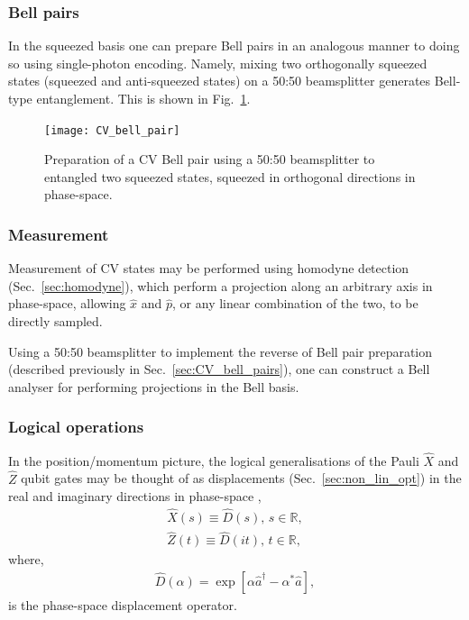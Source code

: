 %
%

\subsubsection{Bell pairs}\label{sec:CV_bell_pairs}

In the squeezed basis one can prepare Bell pairs in an analogous manner to doing so using single-photon encoding. Namely, mixing two orthogonally squeezed states (squeezed and anti-squeezed states) on a 50:50 beamsplitter generates Bell-type entanglement. This is shown in Fig.~\ref{fig:CV_bell_pair}.

\begin{figure}[!htbp]
\texttt{[image: CV\_bell\_pair]}
\captionspacefig \caption{Preparation of a CV Bell pair using a 50:50 beamsplitter to entangled two  squeezed states, squeezed in orthogonal directions in phase-space.}\label{fig:CV_bell_pair}	
\end{figure}


%
%

\subsubsection{Measurement}

Measurement of CV states may be performed using homodyne detection (Sec.~\ref{sec:homodyne}), which perform a projection along an arbitrary axis in phase-space, allowing $\hat{x}$ and $\hat{p}$, or any linear combination of the two, to be directly sampled.

Using a 50:50 beamsplitter to implement the reverse of Bell pair preparation (described previously in Sec.~\ref{sec:CV_bell_pairs}), one can construct a Bell analyser for performing projections in the Bell basis.



%
%

\subsubsection{Logical operations}

In the position/momentum picture, the logical generalisations of the Pauli $\hat{X}$ and $\hat{Z}$ qubit gates may be thought of as displacements (Sec.~\ref{sec:non_lin_opt}) in the real and imaginary directions in phase-space \cite{bib:KokLovettBook},
\begin{align}
\hat{X}(s) \equiv \hat{D}(s)	, \, s\in\mathbb{R},\nonumber\\
\hat{Z}(t) \equiv \hat{D}(it), \, t\in\mathbb{R},
\end{align}
where,
\begin{align}\label{eq:disp_op}
\hat{D}(\alpha) = \exp \left[\alpha\hat{a}^\dag - \alpha^*\hat{a}\right],
\end{align}
is the phase-space displacement operator.

